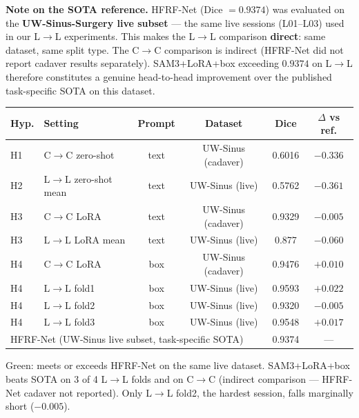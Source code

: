 \documentclass[11pt, a4paper]{article}
\begin{document}
\noindent\textbf{Note on the SOTA reference.}
HFRF-Net (Dice $= 0.9374$) was evaluated on the \textbf{UW-Sinus-Surgery live
subset} --- the same live sessions (L01--L03) used in our L$\to$L experiments.
This makes the L$\to$L comparison \textbf{direct}: same dataset, same split type.
The C$\to$C comparison is indirect (HFRF-Net did not report cadaver results
separately). SAM3+LoRA+box exceeding $0.9374$ on L$\to$L therefore constitutes
a genuine head-to-head improvement over the published task-specific SOTA on this
dataset.

\begin{center}
\begin{tabular}{llcccc}
\toprule
\textbf{Hyp.} & \textbf{Setting} & \textbf{Prompt} & \textbf{Dataset} & \textbf{Dice} & \textbf{$\Delta$ vs ref.} \\
\midrule
H1 & C$\to$C zero-shot      & text & UW-Sinus (cadaver) & 0.6016 & $-0.336$ \\
H2 & L$\to$L zero-shot mean & text & UW-Sinus (live)    & 0.5762 & $-0.361$ \\
H3 & C$\to$C LoRA           & text & UW-Sinus (cadaver) & 0.9329 & $-0.005$ \\
H3 & L$\to$L LoRA mean      & text & UW-Sinus (live)    & 0.877  & $-0.060$ \\
H4 & C$\to$C LoRA           & box  & UW-Sinus (cadaver) & 0.9476 & $+0.010$ \\
\textcolor{sota}{H4} & \textcolor{sota}{L$\to$L fold1} & \textcolor{sota}{box} & \textcolor{sota}{UW-Sinus (live)} & \textcolor{sota}{0.9593} & \textcolor{sota}{$+0.022$} \\
\textcolor{sota}{H4} & \textcolor{sota}{L$\to$L fold2} & \textcolor{sota}{box} & \textcolor{sota}{UW-Sinus (live)} & \textcolor{sota}{0.9320} & \textcolor{sota}{$-0.005$} \\
\textcolor{sota}{H4} & \textcolor{sota}{L$\to$L fold3} & \textcolor{sota}{box} & \textcolor{sota}{UW-Sinus (live)} & \textcolor{sota}{0.9548} & \textcolor{sota}{$+0.017$} \\
\midrule
\multicolumn{4}{l}{HFRF-Net (UW-Sinus live subset, task-specific SOTA)} & 0.9374 & --- \\
\bottomrule
\end{tabular}
\end{center}

\textcolor{sota}{Green}: meets or exceeds HFRF-Net on the same live dataset.
SAM3+LoRA+box beats SOTA on 3 of 4 L$\to$L folds and on C$\to$C (indirect
comparison --- HFRF-Net cadaver not reported). Only L$\to$L fold2, the hardest
session, falls marginally short ($-0.005$).
\end{document}
